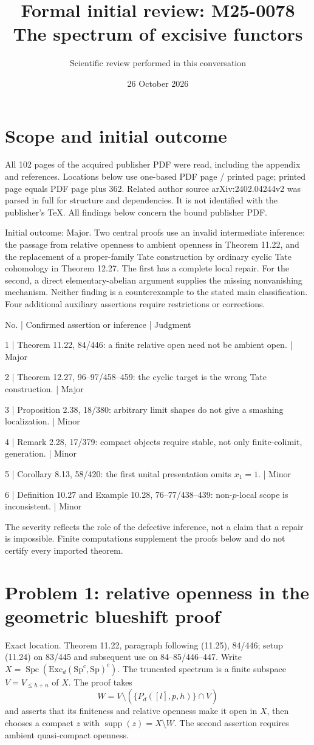 \documentclass[10pt]{article}
\title{Formal initial review: M25-0078
The spectrum of excisive functors}
\author{Scientific review performed in this conversation}
\date{26 October 2026}
\begin{document}
\maketitle
\section*{Scope and initial outcome}
All 102 pages of the acquired publisher PDF were read, including the appendix and references. Locations below use one-based PDF page / printed page; printed page equals PDF page plus 362. Related author source arXiv:2402.04244v2 was parsed in full for structure and dependencies. It is not identified with the publisher’s TeX. All findings below concern the bound publisher PDF.\par
Initial outcome: Major. Two central proofs use an invalid intermediate inference: the passage from relative openness to ambient openness in Theorem 11.22, and the replacement of a proper-family Tate construction by ordinary cyclic Tate cohomology in Theorem 12.27. The first has a complete local repair. For the second, a direct elementary-abelian argument supplies the missing nonvanishing mechanism. Neither finding is a counterexample to the stated main classification. Four additional auxiliary assertions require restrictions or corrections.\par
No. | Confirmed assertion or inference | Judgment\par
1 | Theorem 11.22, 84/446: a finite relative open need not be ambient open. | Major\par
2 | Theorem 12.27, 96–97/458–459: the cyclic target is the wrong Tate construction. | Major\par
3 | Proposition 2.38, 18/380: arbitrary limit shapes do not give a smashing localization. | Minor\par
4 | Remark 2.28, 17/379: compact objects require stable, not only finite-colimit, generation. | Minor\par
5 | Corollary 8.13, 58/420: the first unital presentation omits \(x_1=1\). | Minor\par
6 | Definition 10.27 and Example 10.28, 76–77/438–439: non-\(p\)-local scope is inconsistent. | Minor\par
The severity reflects the role of the defective inference, not a claim that a repair is impossible. Finite computations supplement the proofs below and do not certify every imported theorem.\par
\section*{Problem 1: relative openness in the geometric blueshift proof}
Exact location. Theorem 11.22, paragraph following (11.25), 84/446; setup (11.24) on 83/445 and subsequent use on 84–85/446–447. Write \(X=\operatorname{Spc}(\mathrm{Exc}_d(\mathrm{Sp}^c,\mathrm{Sp})^c)\). The truncated spectrum is a finite subspace \(V=V_{\le h+n}\) of \(X\). The proof takes \[W=V\setminus(\overline{\{P_d([l],p,h)\}}\cap V)\] and asserts that its finiteness and relative openness make it open in \(X\), then chooses a compact \(z\) with \(\operatorname{supp}(z)=X\setminus W\). The second assertion requires ambient quasi-compact openness.\par
\end{document}
